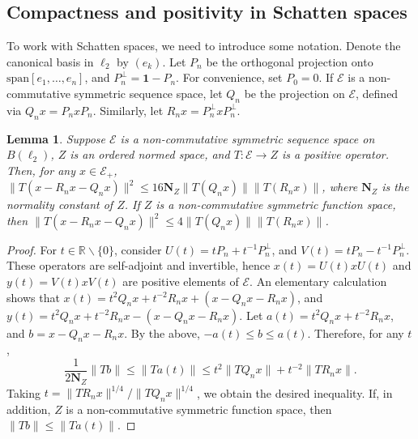 \documentclass[12pt]{amsart}
\theoremstyle{plain}
\newtheorem{lemma}[theorem]{Lemma}
\theoremstyle{definition}
\renewcommand{\leq}{\leqslant}
\newcommand{\one}{\mathbf{1}}
\newcommand{\R}{\mathbb R}
\newcommand{\is}{\mathcal S}
\newcommand{\ce}{\mathcal E}
\newcommand{\se}{{\mathcal S}_{\mathcal{E}}}
\newcommand{\nor}{\mathbf{N}}
\renewcommand{\span}{\mathrm{span}}
\begin{document}

\subsection{Compactness and positivity in Schatten spaces}\label{ss:compact}

To work with Schatten spaces, we need to introduce some notation.
Denote the canonical basis in $\ell_2$ by $(e_k)$.
Let $P_n$ be the orthogonal projection onto
$\span[e_1, \ldots, e_n]$, and $P_n^\perp = \one - P_n$. For convenience, set $P_0 = 0$.
If $\ce$ is a non-commutative symmetric sequence space, let $Q_n$ be
the projection on $\ce$, defined via $Q_n x = P_n x P_n$. Similarly,
let $R_n x = P_n^\perp x P_n^\perp$.

\begin{lemma}\label{lem:maps from S_E}
Suppose $\ce$ is a non-commutative symmetric sequence space on $B(\ell_2)$,
$Z$ is an ordered normed space, and
$T : \ce \to Z$ is a positive operator. Then, for any $x \in \ce_+$,
$\|T(x - R_n x - Q_n x)\|^2 \leq 16 \nor_Z \|T(Q_n x)\| \|T(R_n x)\|$, where
$\nor_Z$ is the normality constant of $Z$.
If $Z$ is a non-commutative symmetric function space, then
$\|T(x - R_n x - Q_n x)\|^2 \leq 4 \|T(Q_n x)\| \|T(R_n x)\|$.
\end{lemma}

\begin{proof}
For $t \in \R \backslash \{0\}$, consider $U(t) = t P_n + t^{-1} P_n^\perp$, and
$V(t) = t P_n - t^{-1} P_n^\perp$. These operators are self-adjoint and invertible,
hence $x(t) = U(t) x U(t)$ and $y(t) = V(t) x V(t)$ are positive elements of $\ce$.
An elementary calculation shows that $x(t) = t^2 Q_n x + t^{-2} R_n x + (x - Q_n x - R_n x)$,
and $y(t) = t^2 Q_n x + t^{-2} R_n x - (x - Q_n x - R_n x)$.
Let $a(t) = t^2 Q_n x + t^{-2} R_n x$,
and $b = x - Q_n x - R_n x$. By the above, $-a(t) \leq b \leq a(t)$. Therefore, for any $t$,
$$
\frac{1}{2\nor_Z} \|Tb\| \leq \|T a(t)\| \leq t^2 \|T Q_n x\| + t^{-2} \|T R_n x\| .
$$
Taking $t = \|T R_n x\|^{1/4}/\|T Q_n x\|^{1/4}$, we obtain the desired inequality.
If, in addition, $Z$ is a non-commutative symmetric function space, then $\|Tb\| \leq \|T a(t)\|$.
\end{proof}
\end{document}
